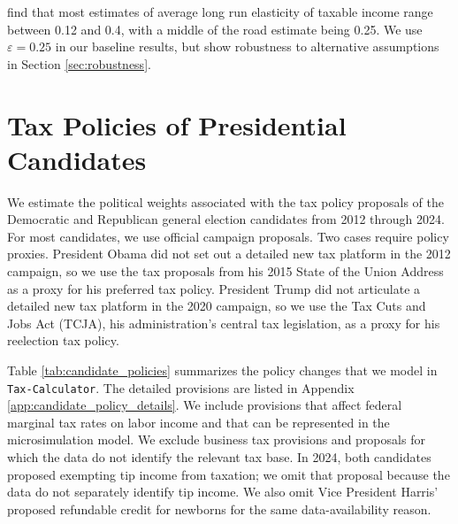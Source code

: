 \documentclass[12pt]{article}
\begin{document}
\cite{SSG2012} find that most estimates of average long run elasticity of taxable income range between 0.12 and 0.4, with a middle of the road estimate being 0.25. We use $\varepsilon=0.25$ in our baseline results, but show robustness to alternative assumptions in Section \ref{sec:robustness}.

\section{Tax Policies of Presidential Candidates}\label{sec:candidate_policy}
We estimate the political weights associated with the tax policy proposals of the Democratic and Republican general election candidates from 2012 through 2024.  For most candidates, we use official campaign proposals.  Two cases require policy proxies.  President Obama did not set out a detailed new tax platform in the 2012 campaign, so we use the tax proposals from his 2015 State of the Union Address as a proxy for his preferred tax policy.  President Trump did not articulate a detailed new tax platform in the 2020 campaign, so we use the Tax Cuts and Jobs Act (TCJA), his administration's central tax legislation, as a proxy for his reelection tax policy.

Table \ref{tab:candidate_policies} summarizes the policy changes that we model in \texttt{Tax-Calculator}.  The detailed provisions are listed in Appendix \ref{app:candidate_policy_details}.  We include provisions that affect federal marginal tax rates on labor income and that can be represented in the microsimulation model.  We exclude business tax provisions and proposals for which the data do not identify the relevant tax base.  In 2024, both candidates proposed exempting tip income from taxation; we omit that proposal because the data do not separately identify tip income.  We also omit Vice President Harris' proposed refundable credit for newborns for the same data-availability reason.
\end{document}
